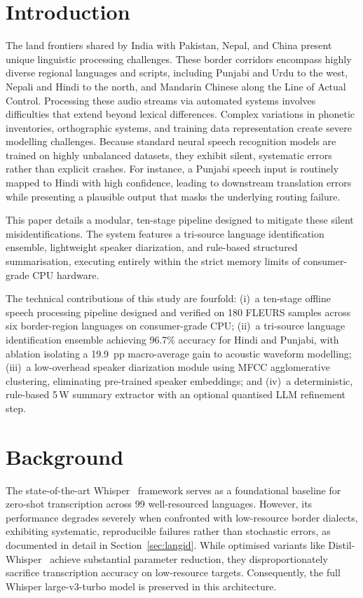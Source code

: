 \documentclass[conference]{IEEEtran}
\begin{document}
\section{Introduction}
\label{sec:intro}

The land frontiers shared by India with Pakistan, Nepal, and China present unique linguistic processing challenges. These border corridors encompass highly diverse regional languages and scripts, including Punjabi and Urdu to the west, Nepali and Hindi to the north, and Mandarin Chinese along the Line of Actual Control. Processing these audio streams via automated systems involves difficulties that extend beyond lexical differences. Complex variations in phonetic inventories, orthographic systems, and training data representation create severe modelling challenges. Because standard neural speech recognition models are trained on highly unbalanced datasets, they exhibit silent, systematic errors rather than explicit crashes. For instance, a Punjabi speech input is routinely mapped to Hindi with high confidence, leading to downstream translation errors while presenting a plausible output that masks the underlying routing failure.

This paper details a modular, ten-stage pipeline designed to mitigate these silent misidentifications. The system features a tri-source language identification ensemble, lightweight speaker diarization, and rule-based structured summarisation, executing entirely within the strict memory limits of consumer-grade CPU hardware.

The technical contributions of this study are fourfold: (i)~a ten-stage offline speech processing pipeline designed and verified on 180 FLEURS samples across six border-region languages on consumer-grade CPU; (ii)~a tri-source language identification ensemble achieving 96.7\% accuracy for Hindi and Punjabi, with ablation isolating a 19.9~pp macro-average gain to acoustic waveform modelling; (iii)~a low-overhead speaker diarization module using MFCC agglomerative clustering, eliminating pre-trained speaker embeddings; and (iv)~a deterministic, rule-based 5\,W summary extractor with an optional quantised LLM refinement step.

\section{Background}
\label{sec:bg}

The state-of-the-art Whisper~\cite{radford2022whisper} framework serves as a foundational baseline for zero-shot transcription across 99 well-resourced languages. However, its performance degrades severely when confronted with low-resource border dialects, exhibiting systematic, reproducible failures rather than stochastic errors, as documented in detail in Section~\ref{sec:langid}. While optimised variants like Distil-Whisper~\cite{gandhi2023distilwhisper} achieve substantial parameter reduction, they disproportionately sacrifice transcription accuracy on low-resource targets. Consequently, the full Whisper large-v3-turbo model is preserved in this architecture.
\end{document}
